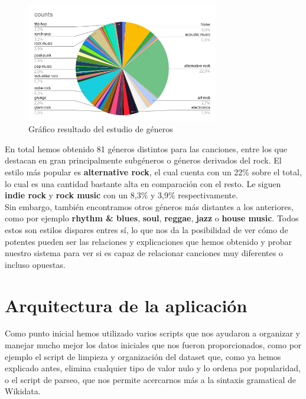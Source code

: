\begin{figure}[h!]
	\centering
	\includegraphics[width = 0.75\textwidth]{Imagenes/Bitmap/estudioGeneros.png}
	\caption{Gráfico resultado del estudio de géneros}
	\label{fig:sampleImage}
\end{figure}

En total hemos obtenido 81 géneros distintos para las canciones, entre los que destacan en gran principalmente subgéneros o géneros derivados del rock. El estilo más popular es \textbf{alternative rock}, el cual cuenta con un 22\% sobre el total, lo cual es una cantidad bastante alta en comparación con el resto. Le siguen \textbf{indie rock} y \textbf{rock music} con un 8,3\% y 3,9\% respectivamente.\\

Sin embargo, también encontramos otros géneros más distantes a los anteriores, como por ejemplo \textbf{rhythm \& blues}, \textbf{soul}, \textbf{reggae}, \textbf{jazz} o \textbf{house music}. Todos estos son estilos dispares entres sí, lo que nos da la posibilidad de ver cómo de potentes pueden ser las relaciones y explicaciones que hemos obtenido y probar nuestro sistema para ver si es capaz de relacionar canciones muy diferentes o incluso opuestas.\\

\section{Arquitectura de la aplicación}

Como punto inicial hemos utilizado varios scripts que nos ayudaron a organizar y manejar mucho mejor los datos iniciales que nos fueron proporcionados, como por ejemplo el script de limpieza y organización del dataset que, como ya hemos explicado antes, elimina cualquier tipo de valor nulo y lo ordena por popularidad, o el script de parseo, que nos permite acercarnos más a la sintaxis gramatical de Wikidata.\\

